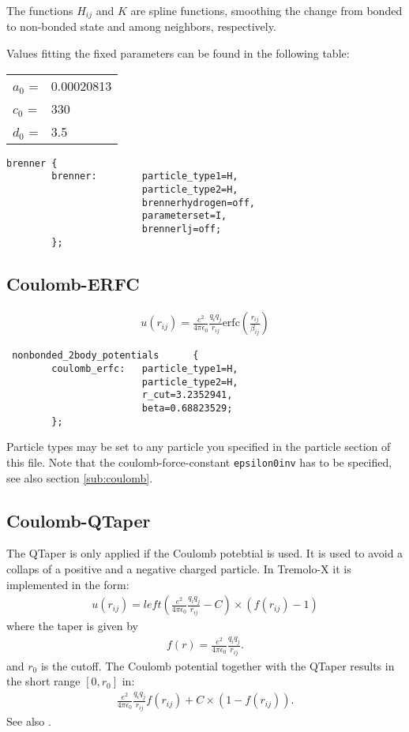 The functions $H_{ij}$ and $K$ are spline functions, smoothing the change from bonded to non-bonded state and among neighbors, respectively.

Values fitting the fixed parameters can be found in the following table:
\begin{tabular}{ll}
$a_0$ = & 0.00020813 \\
$c_0$ = & 330\\
$d_0$ = & 3.5
\end{tabular}

\begin{lstlisting}
brenner {
        brenner:        particle_type1=H,
                        particle_type2=H,
                        brennerhydrogen=off,
                        parameterset=I,
                        brennerlj=off;
        };
\end{lstlisting}


\subsection{Coulomb-ERFC}
\begin{align*}
u(r_{ij}) = \frac{e^2}{4\pi \epsilon_0}\frac{q_i q_j}{r_{ij}} \text{erfc}\left(\frac{r_{ij}}{\beta_{ij}}\right)
\end{align*}

\begin{lstlisting}
 nonbonded_2body_potentials      {
        coulomb_erfc:   particle_type1=H,
                        particle_type2=H,
                        r_cut=3.2352941,
                        beta=0.68823529;
        };
\end{lstlisting}
Particle types may be set to any particle you specified in the particle section of this file. Note that the coulomb-force-constant \verb+epsilon0inv+ has to be specified, see also section \ref{sub:coulomb}.

\subsection{Coulomb-QTaper}

The QTaper is only applied if the Coulomb potebtial is used. It is
used to avoid a collaps of a positive and a negative charged
particle. In Tremolo-X it is implemented in the form:
\begin{align*}
  u(r_{ij}) = left(\frac{e^2}{4\pi \epsilon_0}\frac{q_i q_j}{r_{ij}} -C)\times (f(r_{ij})-1)
\end{align*}
where the taper is given by
\begin{align*}
  f(r) = \frac{e^2}{4\pi \epsilon_0}\frac{q_i q_j}{r_{ij}}.
\end{align*}
and $r_0$ is the cutoff.
The Coulomb potential together with the QTaper results in the short range $[0,r_0]$ in:
\begin{align*}
   \frac{e^2}{4\pi \epsilon_0}\frac{q_i q_j}{r_{ij}}f(r_{ij}) +C \times (1-f(r_{ij})).
\end{align*}
See also \cite{gastreich2003charged}.

